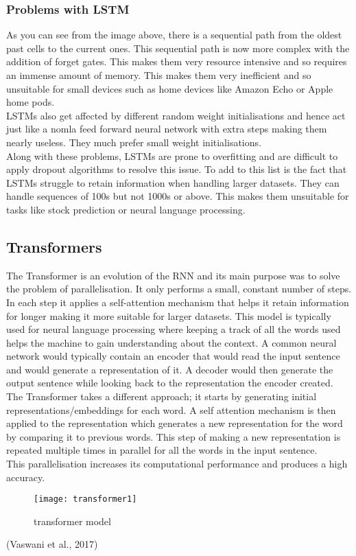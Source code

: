 \documentclass{article}
\begin{document}
\subsubsection{Problems with LSTM}
As you can see from the image above, there is a sequential path from the oldest past cells to the
current ones. This sequential path is now more complex with the addition of forget gates. This
makes them very resource intensive and so requires an immense amount of memory. This makes
them very inefficient and so unsuitable for small devices such as home devices like Amazon
Echo or Apple home pods.\\
LSTMs also get affected by different random weight initialisations and hence act just like a nomla
feed forward neural network with extra steps making them nearly useless. They much prefer
small weight initialisations.\\
Along with these problems, LSTMs are prone to overfitting and are difficult to apply dropout
algorithms to resolve this issue. To add to this list is the fact that LSTMs struggle to retain
information when handling larger datasets. They can handle sequences of 100s but not 1000s or above. This makes them unsuitable for tasks like stock prediction or neural language processing.

\subsection{Transformers}
The Transformer is an evolution of the RNN and its main purpose was to solve the problem of
parallelisation. It only performs a small, constant number of steps. In each step it applies a
self-attention mechanism that helps it retain information for longer making it more suitable for
larger datasets. This model is typically used for neural language processing where keeping a
track of all the words used helps the machine to gain understanding about the context. A
common neural network would typically contain an encoder that would read the input sentence
and would generate a representation of it. A decoder would then generate the output sentence
while looking back to the representation the encoder created. The Transformer takes a different
approach; it starts by generating initial representations/embeddings for each word. A self
attention mechanism is then applied to the representation which generates a new representation
for the word by comparing it to previous words. This step of making a new representation is
repeated multiple times in parallel for all the words in the input sentence.\\
This parallelisation increases its computational performance and produces a high accuracy.
\begin{figure}[h!]
    \centering
    \texttt{[image: transformer1]}
    \caption{transformer model}
\end{figure}
(Vaswani et al., 2017)
\end{document}

